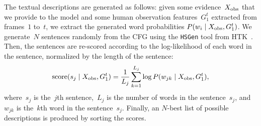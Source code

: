 The textual descriptions are generated as follows: given some evidence~$X_\text{obs}$ that we provide to the model and some human observation features~$G_1^t$ extracted from frames~$1$ to~$t$, we extract the generated word probabilities
$P(w_i \mid X_\text{obs}, G_1^t)$.
We generate~$N$ sentences randomly from the \ac{CFG} using the \texttt{HSGen} tool from HTK~\cite{young:htkbook}.
Then, the sentences are re-scored according to the log-likelihood of each word in the sentence, normalized by the length of the sentence:
\begin{equation} \label{eq:sentence_score}
  \text{score}(s_j \given \xobs, G_1^t) = \frac{1}{L_j} \sum_{k=1}^{L_j} \log P(w_{jk} \given \xobs, G_1^t),
\end{equation}
where~$s_j$ is the~$j$th sentence,~$L_j$ is the number of words in the sentence~$s_j$, and~$w_{jk}$ is the~$k$th word in the sentence~$s_j$.
Finally, an $N$-best list of possible descriptions is produced by sorting the scores.
